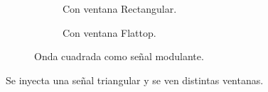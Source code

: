 \begin{figure}[H]
\begin{subfigure}[H]{0.40\textwidth}
          \caption{Con ventana Rectangular.}
          \label{fig:Exp6SeñalFMModulanteCuadradaRectangular}
        \end{subfigure}
        \begin{subfigure}[H]{0.40\textwidth}
          \caption{Con ventana Flattop.}
          \label{fig:Exp6SeñalFMModulanteCuadradaFlattop}
        \end{subfigure}
        \caption{Onda cuadrada como señal modulante.}
        \label{fig:Exp6SeñalFMModulanteCuadrada}
      \end{figure}   

      Se inyecta una señal triangular y se ven distintas ventanas.

